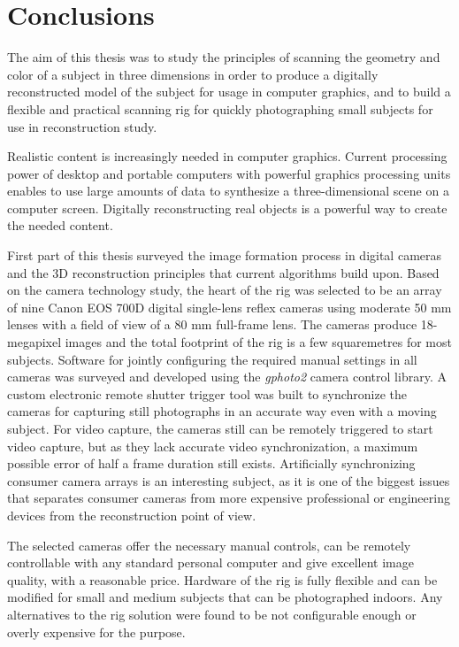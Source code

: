 \section{Conclusions} \label{sec:conclusion} %
The aim of this thesis was to study the principles of scanning the geometry and color of a subject in three dimensions in order to produce a digitally reconstructed model of the subject for usage in computer graphics, and to build a flexible and practical scanning rig for quickly photographing small subjects for use in reconstruction study.

Realistic content is increasingly needed in computer graphics.
Current processing power of desktop and portable computers with powerful graphics processing units enables to use large amounts of data to synthesize a three-dimensional scene on a computer screen.
Digitally reconstructing real objects is a powerful way to create the needed content.

First part of this thesis surveyed the image formation process in digital cameras and the 3D reconstruction principles that current algorithms build upon.
Based on the camera technology study, the heart of the rig was selected to be an array of nine Canon EOS 700D digital single-lens reflex cameras using moderate 50 mm lenses with a field of view of a 80 mm full-frame lens.
The cameras produce 18-megapixel images and the total footprint of the rig is a few squaremetres for most subjects.
Software for jointly configuring the required manual settings in all cameras was surveyed and developed using the \emph{gphoto2} camera control library.
A custom electronic remote shutter trigger tool was built to synchronize the cameras for capturing still photographs in an accurate way even with a moving subject.
For video capture, the cameras still can be remotely triggered to start video capture, but as they lack accurate video synchronization, a maximum possible error of half a frame duration still exists.
Artificially synchronizing consumer camera arrays is an interesting subject, as it is one of the biggest issues that separates consumer cameras from more expensive professional or engineering devices from the reconstruction point of view.

The selected cameras offer the necessary manual controls, can be remotely controllable with any standard personal computer and give excellent image quality, with a reasonable price.
Hardware of the rig is fully flexible and can be modified for small and medium subjects that can be photographed indoors.
Any alternatives to the rig solution were found to be not configurable enough or overly expensive for the purpose.

